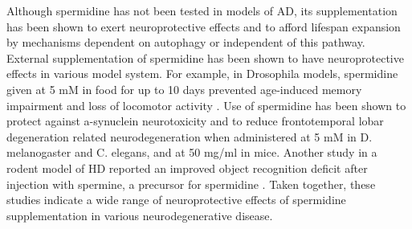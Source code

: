 Although spermidine has not been tested in models of AD, its supplementation has been shown to exert neuroprotective effects and to afford lifespan expansion by mechanisms dependent on autophagy or independent of this pathway. External supplementation of spermidine has been shown to have neuroprotective effects in various model system. For example, in Drosophila models, spermidine given at 5 mM in food for up to 10 days prevented age-induced memory impairment \citep{Gupta2013} and loss of locomotor activity \citep{Minois2014}. Use of spermidine has been shown to protect against a-synuclein neurotoxicity \citep{Buttner2014} and to reduce frontotemporal lobar degeneration \citep{Wang2012} related neurodegeneration when administered at 5 mM in D. melanogaster and C. elegans, and at 50 mg/ml in mice. Another study in a rodent model of HD reported an improved object recognition deficit after injection with spermine, a precursor for spermidine \citep{Velloso2009}. Taken together, these studies indicate a wide range of neuroprotective effects of spermidine supplementation in various neurodegenerative disease. 


